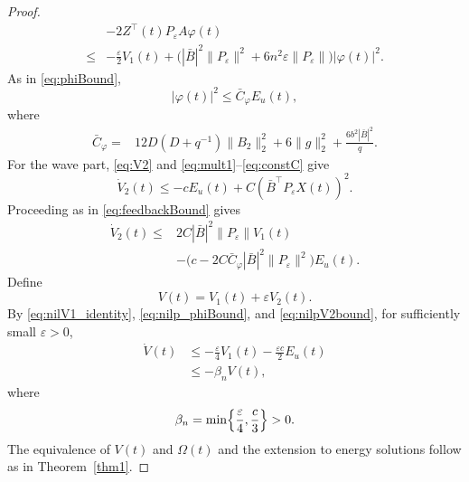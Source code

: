 \documentclass{IEEEtran}
\theoremstyle{definition}
\begin{document}
\begin{proof}
\begin{equation}
\begin{aligned}
 &-2Z^\top(t)P_\varepsilon A\varphi(t)\\
\leq{}&-\frac\varepsilon2V_1(t)
 +\bigl(|\bar B|^2\|P_\varepsilon\|^2
 +6n^2\varepsilon\|P_\varepsilon\|\bigr)|\varphi(t)|^2.
\end{aligned}
\label{eq:nilV1_identity}
\end{equation}
As in \eqref{eq:phiBound},
\begin{equation}
 |\varphi(t)|^2\leq\bar C_\varphi E_u(t),
\label{eq:nilp_phiBound}
\end{equation}
where
\begin{equation}
\begin{aligned}
\bar C_\varphi={}&12D(D+q^{-1})\|B_2\|_2^2+6\|g\|_2^2
 +\frac{6b^2|\bar B|^2}{q}.
\end{aligned}
\label{eq:nilp_Cphi}
\end{equation}
For the wave part, \eqref{eq:V2} and
\eqref{eq:mult1}--\eqref{eq:constC} give
\begin{equation}
 \dot V_2(t)\leq-cE_u(t)
  +C(\bar B^\top P_\varepsilon X(t))^2.
\label{eq:nilV2}
\end{equation}
Proceeding as in \eqref{eq:feedbackBound} gives
\begin{equation}
\begin{aligned}
\dot V_2(t)\leq{}&2C|\bar B|^2\|P_\varepsilon\|V_1(t)\\
 &-\bigl(c-2C\bar C_\varphi|\bar B|^2\|P_\varepsilon\|^2\bigr)E_u(t).
\end{aligned}
\label{eq:nilpV2bound}
\end{equation}
Define
\begin{equation}
 V(t)=V_1(t)+\varepsilon V_2(t).
\label{eq:nilpV}
\end{equation}
By \eqref{eq:nilV1_identity}, \eqref{eq:nilp_phiBound}, and
\eqref{eq:nilpV2bound}, for sufficiently small $\varepsilon>0$,
\begin{equation}
\begin{aligned}
 \dot V(t)&\leq-\frac\varepsilon4V_1(t)
                 -\frac{\varepsilon c}2E_u(t)\\
          &\leq-\beta_n V(t),
\end{aligned}
\label{eq:nilVdecay}
\end{equation}
where
\begin{equation}
 \beta_n=\min\Bigl\{\frac\varepsilon4,\frac c3\Bigr\}>0.
\label{eq:betaN}
\end{equation}
The equivalence of $V(t)$ and $\Omega(t)$ and the extension to
energy solutions follow as in Theorem~\ref{thm1}.
\end{proof}
\end{document}
